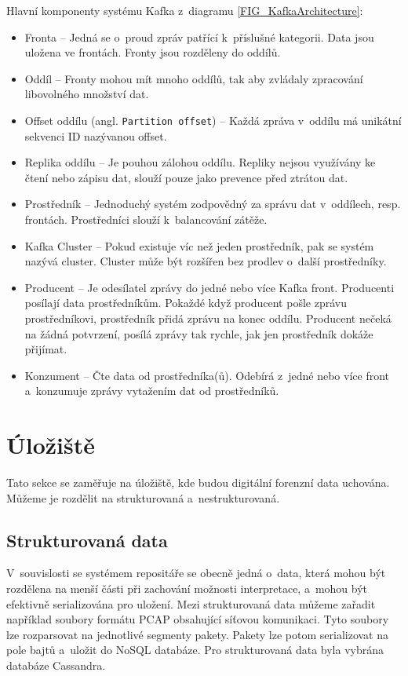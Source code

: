 \vspace{0.5cm}
\noindent Hlavní komponenty systému Kafka z~diagramu \ref{FIG_KafkaArchitecture}:
\begin{itemize}
    \item Fronta -- Jedná se o~proud zpráv patřící k~příslušné kategorii. Data jsou uložena ve frontách. Fronty jsou rozděleny do oddílů.
    
    \item Oddíl -- Fronty mohou mít mnoho oddílů, tak aby zvládaly zpracování libovolného množství dat.

    \item Offset oddílu (angl. \texttt{Partition offset}) -- Každá zpráva v~oddílu má unikátní sekvenci ID nazývanou offset.

    \item Replika oddílu -- Je pouhou zálohou oddílu. Repliky nejsou využívány ke čtení nebo zápisu dat, slouží pouze jako prevence před ztrátou dat.
    
    \item Prostředník -- Jednoduchý systém zodpovědný za správu dat v~oddílech, resp. frontách. Prostředníci slouží k~balancování zátěže.
    
    \item Kafka Cluster -- Pokud existuje víc než jeden prostředník, pak se systém nazývá cluster. Cluster může být rozšířen bez prodlev o~další prostředníky.
    
    \item Producent -- Je odesílatel zprávy do jedné nebo více Kafka front. Producenti posílají data prostředníkům. Pokaždé když producent pošle zprávu prostředníkovi, prostředník přidá zprávu na konec oddílu. Producent nečeká na žádná potvrzení, posílá zprávy tak rychle, jak jen prostředník dokáže přijímat.
    
    \item Konzument -- Čte data od prostředníka(ů). Odebírá z~jedné nebo více front a~konzumuje zprávy vytažením dat od prostředníků.
\end{itemize}

\section{Úložiště}
Tato sekce se zaměřuje na úložiště, kde budou digitální forenzní data uchována. Můžeme je rozdělit na strukturovaná a~nestrukturovaná.

\subsection{Strukturovaná data}
V~souvislosti se systémem repositáře se obecně jedná o~data, která mohou být rozdělena na menší části při zachování možnosti interpretace, a~mohou být efektivně serializována pro uložení. Mezi strukturovaná data můžeme zařadit například soubory formátu PCAP obsahující síťovou komunikaci. Tyto soubory lze rozparsovat na jednotlivé segmenty pakety. Pakety lze potom serializovat na pole bajtů a~uložit do NoSQL databáze. Pro strukturovaná data byla vybrána databáze Cassandra.

